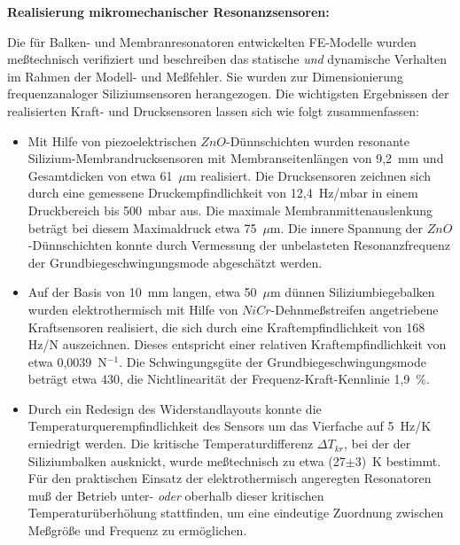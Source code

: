{\bf Realisierung mikromechanischer Resonanzsensoren:}

Die für Balken- und Membranresonatoren entwickelten FE-Modelle wurden
meßtechnisch verifiziert und beschreiben das statische {\em und}
dynamische Verhalten im Rahmen der Modell- und Meßfehler. Sie wurden zur
Dimensionierung frequenzanaloger Siliziumsensoren herangezogen. Die
wichtigsten Ergebnissen der realisierten Kraft- und Drucksensoren lassen
sich wie folgt zusammenfassen:
\begin{itemize}
\item
Mit Hilfe von piezoelektrischen $ZnO$-Dünnschichten wurden resonante
Silizium-Membrandrucksensoren mit Membranseitenlängen von 9,2~mm
und Gesamtdicken von etwa 61~$\mu$m realisiert. Die Drucksensoren
zeichnen sich durch eine gemessene Druckempfindlichkeit von 12,4~Hz/mbar
in einem Druckbereich bis 500~mbar aus. Die maximale Membranmittenauslenkung
beträgt bei diesem Maximaldruck etwa 75~$\mu$m. Die innere
Spannung der $ZnO$-Dünnschichten konnte durch Vermessung der unbelasteten
Resonanzfrequenz der Grundbiegeschwingungsmode abgeschätzt werden.
\item
Auf der Basis von 10~mm langen, etwa 50~$\mu$m dünnen Siliziumbiegebalken
wurden elektrothermisch mit Hilfe von $NiCr$-Dehnmeßstreifen
angetriebene Kraftsensoren realisiert, die sich durch eine
Kraftempfindlichkeit von 168 Hz/N auszeichnen. Dieses entspricht einer
relativen Kraftempfindlichkeit von etwa 0,0039~N$^{-1}$. Die
Schwingungsgüte der Grundbiegeschwingungsmode beträgt etwa 430,
die Nichtlinearität der Frequenz-Kraft-Kennlinie 1,9~\%.
\item
Durch ein Redesign des Widerstandlayouts konnte die
Temperaturquerempfindlichkeit des Sensors um das Vierfache auf
5~Hz/K erniedrigt werden. Die kritische
Temperaturdifferenz $\Delta T_{kr}$, bei der der Siliziumbalken ausknickt,
wurde meßtechnisch zu etwa (27$\pm3$)~K bestimmt.
Für den praktischen Einsatz der elektrothermisch angeregten Resonatoren
muß der Betrieb unter- {\em oder} oberhalb dieser kritischen
Temperaturüberhöhung stattfinden, um eine eindeutige
Zuordnung zwischen Meßgröße und Frequenz zu ermöglichen.
\end{itemize}
